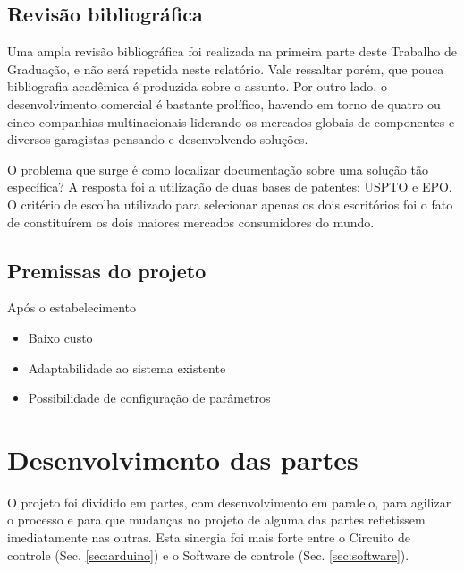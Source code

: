 \documentclass[a4paper,11pt]{article}
\begin{document}
\subsection{Revisão bibliográfica}
Uma ampla revisão bibliográfica foi realizada na primeira parte deste Trabalho
de Graduação, e não será repetida neste relatório. Vale ressaltar porém, que
pouca bibliografia acadêmica é produzida sobre o assunto. Por outro lado, o
desenvolvimento comercial é bastante prolífico, havendo em torno de quatro ou
cinco companhias multinacionais liderando os mercados globais de componentes e
diversos garagistas pensando e desenvolvendo soluções.

O problema que surge é como localizar documentação sobre uma solução tão
específica? A resposta foi a utilização de duas bases de patentes:
USPTO\cite{uspto} e EPO\cite{epo}. O critério de escolha utilizado para
selecionar apenas os dois escritórios foi o fato de constituírem os dois maiores
mercados consumidores do mundo.


\subsection{Premissas do projeto}
Após o estabelecimento 
\begin{itemize}
  \item Baixo custo
  \item Adaptabilidade ao sistema existente
  \item Possibilidade de configuração de parâmetros
\end{itemize}



\pagebreak
%
\section{Desenvolvimento das partes}
\label{sec:partes}
O projeto foi dividido em partes, com desenvolvimento em paralelo, para agilizar
o processo e para que mudanças no projeto de alguma das partes refletissem
imediatamente nas outras. Esta sinergia foi mais forte entre o Circuito de
controle (Sec. \ref{sec:arduino}) e o Software de controle (Sec.
\ref{sec:software}).
\end{document}
